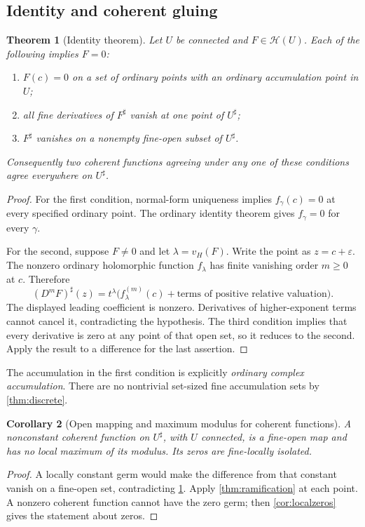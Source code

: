 \documentclass[11pt,letterpaper]{article}
\newtheorem{theorem}{Theorem}[section]
\newtheorem{corollary}[theorem]{Corollary}
\theoremstyle{definition}
\theoremstyle{remark}
\newcommand{\HH}{\mathcal H}
\newcommand{\sh}{^{\sharp}}
\numberwithin{equation}{section}
\begin{document}
\subsection{Identity and coherent gluing}
\begin{theorem}[Identity theorem]\label{thm:identity}
Let $U$ be connected and $F\in\HH(U)$. Each of the following implies $F=0$:
\begin{enumerate}
\item $F(c)=0$ on a set of ordinary points with an ordinary accumulation point in $U$;
\item all fine derivatives of $F\sh$ vanish at one point of $U\sh$;
\item $F\sh$ vanishes on a nonempty fine-open subset of $U\sh$.
\end{enumerate}
Consequently two coherent functions agreeing under any one of these conditions agree everywhere on $U\sh$.
\end{theorem}
\begin{proof}
For the first condition, normal-form uniqueness implies $f_\gamma(c)=0$ at every specified ordinary point. The ordinary identity theorem gives $f_\gamma=0$ for every $\gamma$.

For the second, suppose $F\ne0$ and let $\lambda=v_H(F)$. Write the point as $z=c+\varepsilon$. The nonzero ordinary holomorphic function $f_\lambda$ has finite vanishing order $m\ge0$ at $c$. Therefore
\[
 (D^mF)\sh(z)
 =t^\lambda\bigl(f_\lambda^{(m)}(c)+\text{terms of positive relative valuation}\bigr).
\]
The displayed leading coefficient is nonzero. Derivatives of higher-exponent terms cannot cancel it, contradicting the hypothesis. The third condition implies that every derivative is zero at any point of that open set, so it reduces to the second. Apply the result to a difference for the last assertion.
\end{proof}
The accumulation in the first condition is explicitly \emph{ordinary complex accumulation}. There are no nontrivial set-sized fine accumulation sets by \cref{thm:discrete}.

\begin{corollary}[Open mapping and maximum modulus for coherent functions]\label{cor:coherentopen}
A nonconstant coherent function on $U\sh$, with $U$ connected, is a fine-open map and has no local maximum of its modulus. Its zeros are fine-locally isolated.
\end{corollary}
\begin{proof}
A locally constant germ would make the difference from that constant vanish on a fine-open set, contradicting \cref{thm:identity}. Apply \cref{thm:ramification} at each point. A nonzero coherent function cannot have the zero germ; then \cref{cor:localzeros} gives the statement about zeros.
\end{proof}
\end{document}
